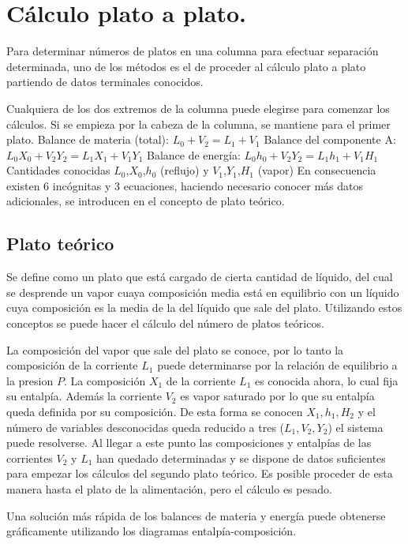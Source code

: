 \documentclass[11pt,openany]{book}
\begin{document}
\section{Cálculo plato a plato.}
Para determinar números de platos en una columna para efectuar separación determinada, uno 
de los métodos es el de proceder al cálculo plato a plato partiendo de datos terminales conocidos.

Cualquiera de los dos extremos de la columna puede elegirse para comenzar los cálculos. Si se 
empieza por la cabeza de la columna, se mantiene para el primer plato.
\newline
Balance de materia (total): $L_0+V_2=L_1+V_1$
\newline \newline
Balance del componente A: $L_0 X_0 + V_2 Y_2 = L_1 X_1 + V_1 Y_1$
\newline \newline
Balance de energía: $L_0 h_0+V_2 Y_2=L_1 h_1+V_1 H_1$
\newline\newline
Cantidades conocidas $L_0$,$X_0$,$h_0$ (reflujo) y $V_1$,$Y_1$,$ H_1$ (vapor)
\newline\newline
En consecuencia existen 6 incógnitas y 3 ecuaciones, haciendo necesario conocer más datos 
adicionales, se introducen en el concepto de plato teórico.
\subsection{Plato teórico}
Se define como un plato que está cargado de cierta cantidad de líquido, del cual se desprende 
un vapor cuaya composición media está en equilibrio con un líquido cuya composición es la media de 
la del líquido que sale del plato. Utilizando estos conceptos se puede hacer el cálculo del número de 
platos teóricos.

La composición del vapor que sale del plato se conoce, por lo tanto la composición de la corriente 
$L_1$ puede determinarse por la relación de equilibrio a la presion $P$. La composición $X_1$ de la corriente 
$L_1$ es conocida ahora, lo cual fija su entalpía. Además la corriente $V_2$ es vapor saturado por lo que 
su entalpía queda definida por su composición. De esta forma se conocen $X_1, h_1, H_2$ y el número 
de variables desconocidas queda reducido a tres ($L_1,V_2,Y_2$) el sistema puede resolverse. Al llegar a
este punto las composiciones y entalpías de las corrientes $V_2$ y $L_1$ han quedado determinadas y se 
dispone de datos suficientes para empezar los cálculos del segundo plato teórico. Es posible 
proceder de esta manera hasta el plato de la alimentación, pero el cálculo es pesado.

Una solución más rápida de los balances de materia y energía puede obtenerse gráficamente 
utilizando los diagramas entalpía-composición.
\end{document}
